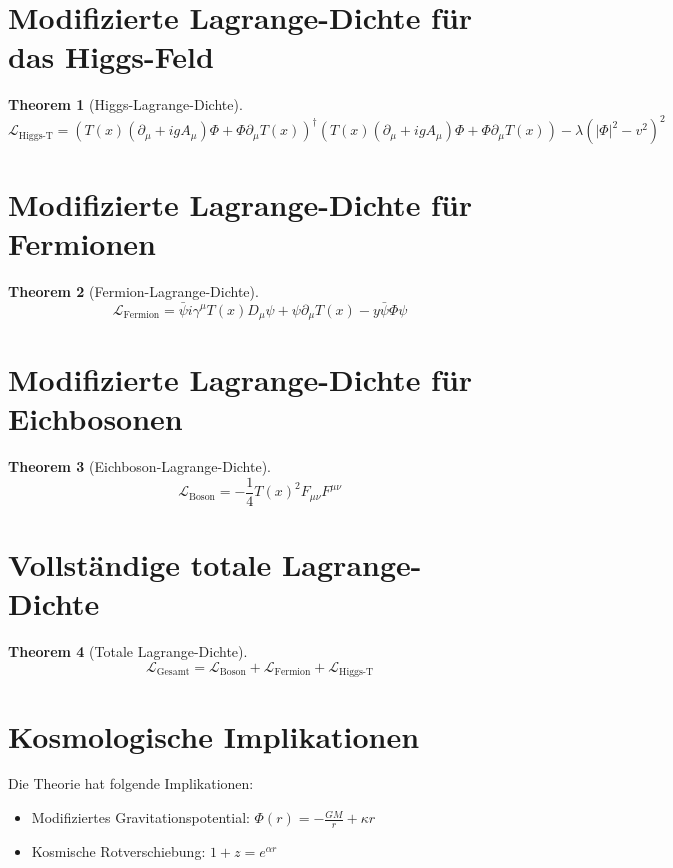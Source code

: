 \documentclass{article}
\newcommand{\Tfield}{T(x)}
\newcommand{\DcovT}[1]{\Tfield D_\mu #1 + #1 \partial_\mu \Tfield}
\newcommand{\DhiggsT}{\Tfield (\partial_\mu + igA_\mu)\Phi + \Phi \partial_\mu \Tfield}
\newtheorem{theorem}{Theorem}[section]
\theoremstyle{definition}
\theoremstyle{remark}
\begin{document}
	\section{Modifizierte Lagrange-Dichte für das Higgs-Feld}
	\begin{theorem}[Higgs-Lagrange-Dichte]
		\begin{equation}
			\mathcal{L}_{\text{Higgs-T}} = (\DhiggsT)^\dagger (\DhiggsT) - \lambda(|\Phi|^2 - v^2)^2
		\end{equation}
	\end{theorem}
	
	\section{Modifizierte Lagrange-Dichte für Fermionen}
	\begin{theorem}[Fermion-Lagrange-Dichte]
		\begin{equation}
			\mathcal{L}_{\text{Fermion}} = \bar{\psi} i \gamma^\mu \DcovT{\psi} - y \bar{\psi} \Phi \psi
		\end{equation}
	\end{theorem}
	
	\section{Modifizierte Lagrange-Dichte für Eichbosonen}
	\begin{theorem}[Eichboson-Lagrange-Dichte]
		\begin{equation}
			\mathcal{L}_{\text{Boson}} = -\frac{1}{4} \Tfield^2 F_{\mu\nu} F^{\mu\nu}
		\end{equation}
	\end{theorem}
	
	\section{Vollständige totale Lagrange-Dichte}
	\begin{theorem}[Totale Lagrange-Dichte]
		\begin{equation}
			\mathcal{L}_{\text{Gesamt}} = \mathcal{L}_{\text{Boson}} + \mathcal{L}_{\text{Fermion}} + \mathcal{L}_{\text{Higgs-T}}
		\end{equation}
	\end{theorem}
	
	\section{Kosmologische Implikationen}
	Die Theorie hat folgende Implikationen:
	\begin{itemize}
		\item Modifiziertes Gravitationspotential: \( \Phi(r) = -\frac{GM}{r} + \kappa r \)
		\item Kosmische Rotverschiebung: \( 1 + z = e^{\alpha r} \)
	\end{itemize}

	
\end{document}
